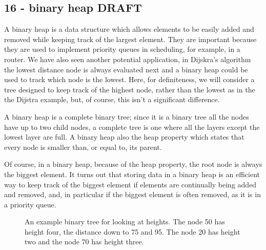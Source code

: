 \documentclass[11pt,a4paper]{scrartcl}
\begin{document}

\subsection*{16 - binary heap DRAFT}

A binary heap is a data structure which allows elements to be easily
added and removed while keeping track of the largest element. They are
important because they are used to implement priority queues in
scheduling, for example, in a router. We have also seen another
potential application, in Dijskra's algorithm the lowest distance node
is always evaluated next and a binary heap could be used to track
which node is the lowest. Here, for definiteness, we will consider a
tree designed to keep track of the highest node, rather than the
lowest as in the the Dijstra example, but, of course, this isn't a
significant difference.

A binary heap is a complete binary tree; since it is a binary tree all
the nodes have up to two child nodes, a complete tree is one where all
the layers except the lowest layer are full. A binary heap also the
heap property which states that every node is smaller than, or equal
to, its parent.

Of course, in a binary heap, because of the heap property, the root
node is always the biggest element. It turns out that storing data in
a binary heap is an efficient way to keep track of the biggest element
if elements are continually being added and removed, and, in
particular if the biggest element is often removed, as it is in a
priority queue.
















\begin{figure}
\begin{center}
\end{center}
\caption{An example binary tree for looking at heights. The node 50
  has height four, the distance down to 75 and 95. The node 20 has
  height two and the node 70 has height
  three.\label{fig_example_tree}}
\end{figure}
\end{document}
